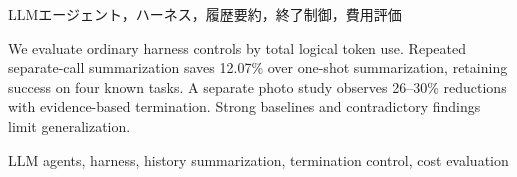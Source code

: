 \begin{abstract}
LLMエージェントの通常ハーネス制御を評価した．既知4課題の成功を保ち，別呼出し反復要約は単発より12.07\%減となった．別実験の写真課題2条件では証拠付き終了で26–30\%減を観測した．全呼出し費用と強い対照から，適用範囲を検討する．
\end{abstract}
\begin{keyword}
LLMエージェント，ハーネス，履歴要約，終了制御，費用評価
\end{keyword}
\begin{eabstract}
We evaluate ordinary harness controls by total logical token use. Repeated separate-call summarization saves 12.07\% over one-shot summarization, retaining success on four known tasks. A separate photo study observes 26–30\% reductions with evidence-based termination. Strong baselines and contradictory findings limit generalization.
\end{eabstract}
\begin{ekeyword}
LLM agents, harness, history summarization, termination control, cost evaluation
\end{ekeyword}
